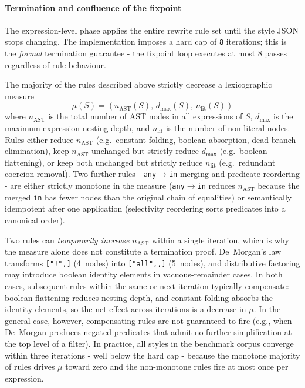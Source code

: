\paragraph{Termination and confluence of the fixpoint}
The expression-level phase applies the entire rewrite rule set until the style JSON stops changing.
The implementation imposes a hard cap of \texttt{8} iterations; this is the \emph{formal} termination guarantee - the fixpoint loop executes at most 8 passes regardless of rule behaviour.

The majority of the rules described above strictly decrease a lexicographic measure
\begin{equation}\label{eq:termination_measure}
    \mu(S) = (n_{\mathrm{AST}}(S),\, d_{\max}(S),\, n_{\mathrm{lit}}(S))
\end{equation}
where $n_{\mathrm{AST}}$ is the total number of \ac{AST} nodes in all expressions of $S$, $d_{\max}$ is the maximum expression nesting depth, and $n_{\mathrm{lit}}$ is the number of non-literal nodes.
Rules either reduce $n_{\mathrm{AST}}$ (e.g.\ constant folding, boolean absorption, dead-branch elimination), keep $n_{\mathrm{AST}}$ unchanged but strictly reduce $d_{\max}$ (e.g.\ boolean flattening), or keep both unchanged but strictly reduce $n_{\mathrm{lit}}$ (e.g.\ redundant coercion removal).
Two further rules - \texttt{any}$\to$\texttt{in} merging and predicate reordering - are either strictly monotone in the measure (\texttt{any}$\to$\texttt{in} reduces $n_{\mathrm{AST}}$ because the merged \texttt{in} has fewer nodes than the original chain of equalities) or semantically idempotent after one application (selectivity reordering sorts predicates into a canonical order).

Two rules can \emph{temporarily increase} $n_{\mathrm{AST}}$ within a single iteration, which is why the measure alone does not constitute a termination proof.
De~Morgan's law transforms \texttt{["!",]} (4~nodes) into \texttt{["all",\allowbreak["!",\allowbreak A],\allowbreak["!",\allowbreak B]]} (5~nodes), and distributive factoring may introduce boolean identity elements in vacuous-remainder cases.
In both cases, subsequent rules within the same or next iteration typically compensate: boolean flattening reduces nesting depth, and constant folding absorbs the identity elements, so the net effect across iterations is a decrease in $\mu$.
In the general case, however, compensating rules are not guaranteed to fire (e.g., when De~Morgan produces negated predicates that admit no further simplification at the top level of a filter).
In practice, all styles in the benchmark corpus converge within three iterations - well below the hard cap - because the monotone majority of rules drives $\mu$ toward zero and the non-monotone rules fire at most once per expression.

